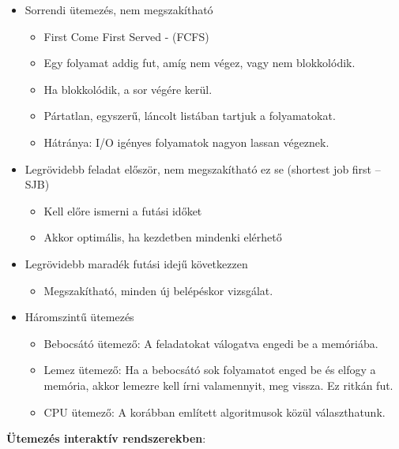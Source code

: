 \documentclass[margin=0px]{article}
\begin{document}
\begin{itemize}
    \item Sorrendi ütemezés, nem megszakítható
          \begin{itemize}
              \item First Come First Served - (FCFS)
              \item Egy folyamat addig fut, amíg nem végez, vagy nem blokkolódik.
              \item Ha blokkolódik, a sor végére kerül.
              \item Pártatlan, egyszerű, láncolt listában tartjuk a folyamatokat.
              \item Hátránya: I/O igényes folyamatok nagyon lassan végeznek.
          \end{itemize}
    \item Legrövidebb feladat először, nem megszakítható ez se (shortest job first -- SJB)
          \begin{itemize}
              \item Kell előre ismerni a futási időket
              \item Akkor optimális, ha kezdetben mindenki elérhető
          \end{itemize}
    \item Legrövidebb maradék futási idejű következzen
          \begin{itemize}
              \item Megszakítható, minden új belépéskor vizsgálat.
          \end{itemize}
    \item Háromszintű ütemezés
          \begin{itemize}
              \item Bebocsátó ütemező: A feladatokat válogatva engedi be a memóriába.
              \item Lemez ütemező: Ha a bebocsátó sok folyamatot enged be és elfogy a memória, akkor lemezre kell írni valamennyit, meg vissza. Ez ritkán fut.
              \item CPU ütemező: A korábban említett algoritmusok közül választhatunk.
          \end{itemize}
\end{itemize}
\textbf{Ütemezés interaktív rendszerekben}:
\end{document}
